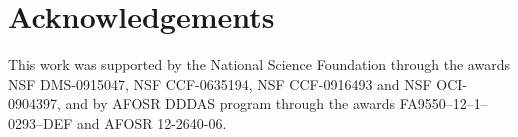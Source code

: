 \documentclass{article}
\begin{document}
\section*{Acknowledgements}


This work was supported by the National Science Foundation through the awards NSF DMS-0915047, NSF CCF-0635194, NSF CCF-0916493 and NSF OCI-0904397,
and by AFOSR DDDAS program through the awards FA9550--12--1--0293--DEF and AFOSR 12-2640-06.



\newpage
\setcounter{page}{1}



\end{document}
